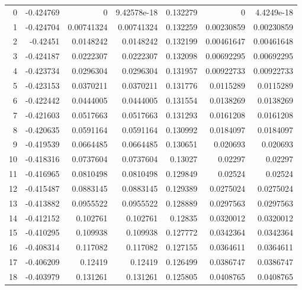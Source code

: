 \begin{tabular}{rrrrrrr}
\hline
   0 & -0.424769    & 0           & 9.42578e-18 &  0.132279    & 0           & 4.4249e-18  \\
   1 & -0.424704    & 0.00741324  & 0.00741324  &  0.132259    & 0.00230859  & 0.00230859  \\
   2 & -0.42451     & 0.0148242   & 0.0148242   &  0.132199    & 0.00461647  & 0.00461648  \\
   3 & -0.424187    & 0.0222307   & 0.0222307   &  0.132098    & 0.00692295  & 0.00692295  \\
   4 & -0.423734    & 0.0296304   & 0.0296304   &  0.131957    & 0.00922733  & 0.00922733  \\
   5 & -0.423153    & 0.0370211   & 0.0370211   &  0.131776    & 0.0115289   & 0.0115289   \\
   6 & -0.422442    & 0.0444005   & 0.0444005   &  0.131554    & 0.0138269   & 0.0138269   \\
   7 & -0.421603    & 0.0517663   & 0.0517663   &  0.131293    & 0.0161208   & 0.0161208   \\
   8 & -0.420635    & 0.0591164   & 0.0591164   &  0.130992    & 0.0184097   & 0.0184097   \\
   9 & -0.419539    & 0.0664485   & 0.0664485   &  0.130651    & 0.020693    & 0.020693    \\
  10 & -0.418316    & 0.0737604   & 0.0737604   &  0.13027     & 0.02297     & 0.02297     \\
  11 & -0.416965    & 0.0810498   & 0.0810498   &  0.129849    & 0.02524     & 0.02524     \\
  12 & -0.415487    & 0.0883145   & 0.0883145   &  0.129389    & 0.0275024   & 0.0275024   \\
  13 & -0.413882    & 0.0955522   & 0.0955522   &  0.128889    & 0.0297563   & 0.0297563   \\
  14 & -0.412152    & 0.102761    & 0.102761    &  0.12835     & 0.0320012   & 0.0320012   \\
  15 & -0.410295    & 0.109938    & 0.109938    &  0.127772    & 0.0342364   & 0.0342364   \\
  16 & -0.408314    & 0.117082    & 0.117082    &  0.127155    & 0.0364611   & 0.0364611   \\
  17 & -0.406209    & 0.12419     & 0.12419     &  0.126499    & 0.0386747   & 0.0386747   \\
  18 & -0.403979    & 0.131261    & 0.131261    &  0.125805    & 0.0408765   & 0.0408765   \\

\end{tabular}
